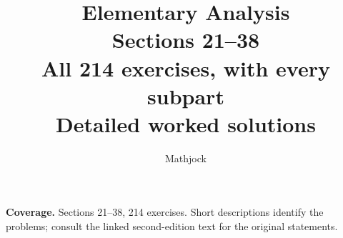 
\title{\textbf{Elementary Analysis}\\[0.3em]
Sections 21--38\\[0.4em]
\large All 214 exercises, with every subpart\\
Detailed worked solutions}
\author{Mathjock}
\date{}

\maketitle
\bookinfo
\par\textbf{Coverage.} Sections 21--38, 214 exercises. Short descriptions identify the problems; consult the linked second-edition text for the original statements.
\tableofcontents
\clearpage
\setcounter{section}{20}

\clearpage

\clearpage

\clearpage

\clearpage

\clearpage

\clearpage

\clearpage

\clearpage

\clearpage

\clearpage

\clearpage

\clearpage

\clearpage

\clearpage

\clearpage

\clearpage

\clearpage


